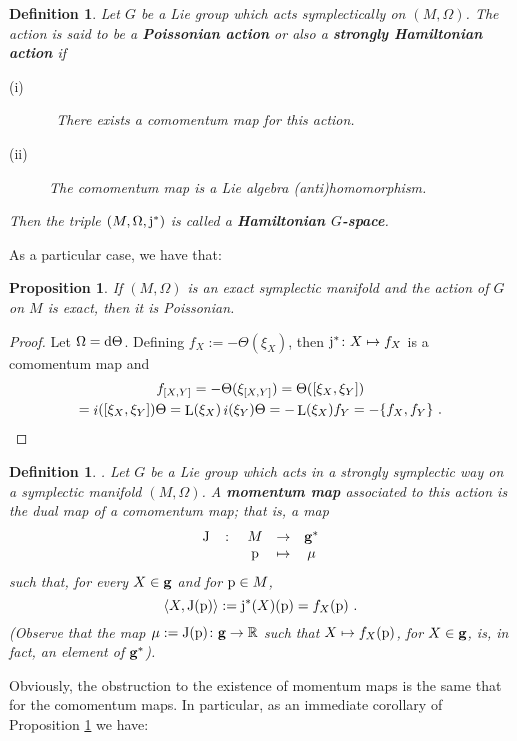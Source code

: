 \documentclass[12pt]{report}
\newtheorem{prop}[teor]{Proposition}
\newtheorem{definition}[teor]{Definition}
\def\qed{\ifvmode\removelastskip\fi
{\unskip\nobreak\hfil\penalty50\hbox{}\nobreak\hfil
\hbox{\vrule height1.2ex width1.2ex}\parfillskip=0pt
\finalhyphendemerits=0 \par\smallskip}}
\def\d{{\rm d}}
\def\Real{\mathbb{R}}
\def\Lie{\mathop{\rm L}\nolimits}
\def\inn{\mathop{i}\nolimits}
\begin{document}
\begin{definition}
Let $G$ be a Lie group which acts symplectically on $(M,\Omega)$.
The action is said to be a \textbf{Poissonian action} 
or also a \textbf{strongly Hamiltonian action} if
\begin{description}
\item[{\rm (i)}] \ 
There exists a comomentum map for this action.
\item[{\rm (ii)}]
The comomentum map is a Lie algebra (anti)homomorphism.
\end{description}
Then the triple $(M,\Omega,{\rm j}^*)$ is called a
\textbf{Hamiltonian $G$-space}.
\end{definition}

As a particular case, we have that:

\begin{prop}
If $(M,\Omega )$ is an exact symplectic manifold
and the action of $G$ on $M$ is exact, then it is Poissonian.
\label{exact}
\end{prop}
\begin{proof}
Let $\Omega =\d \Theta$.
Defining $f_X := -\Theta (\xi_X)$, then
${\rm j}^* \colon X \mapsto f_X$ is a comomentum map and
\begin{multline*}
f_{[X,Y]}=-\Theta (\xi_{[X,Y]}) = 
\Theta ([\xi_X,\xi_Y]) \\
= \inn([\xi_X,\xi_Y])\Theta
=\Lie(\xi_X)\inn(\xi_Y)\Theta = 
-\Lie(\xi_X)f_Y = -\{ f_X,f_Y \} \ .
\end{multline*}
\qed  \end{proof}

\begin{definition}
\cite{So-ssd}.
Let $G$ be a Lie group which acts 
in a strongly symplectic way on a symplectic manifold $(M,\Omega)$.
A \textbf{momentum map} associated to this action
is the dual map of a comomentum map; that is, a map
$$
\begin{array}{ccccc}
{\rm J}&\colon&M&\to&{\bf g}^*
\\
& &{\rm p}&\mapsto&\mu
\end{array}
$$
such that, for every $X \in {\bf g}$ and for ${\rm p}\in M$,
$$
\langle X,{\rm J}({\rm p})\rangle:={\rm j}^*(X)({\rm p})=f_X({\rm p}) \ .
$$
(Observe that the map
$\mu:= {\rm J}({\rm p})\colon{\bf g}\to\Real$ such that 
$X\mapsto f_X({\rm p})$, for $X\in{\bf g}$,
is, in fact, an element of ${\bf g}^*$).
\end{definition}

Obviously, the obstruction to the existence of momentum maps is
the same that for the comomentum maps.
In particular, as an immediate corollary of Proposition
\ref{exact} we have:
\end{document}
